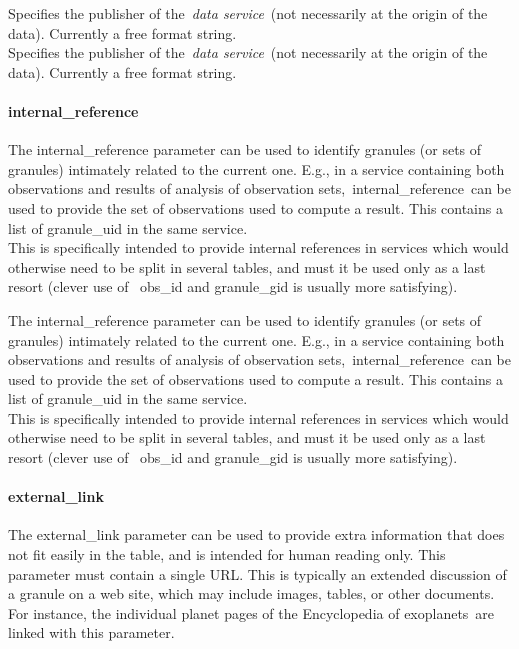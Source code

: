 \documentclass[11pt,a4paper]{ivoa}
\begin{document}
Specifies the publisher of the \emph{data service} (not necessarily at the origin of the data). Currently a free format string.\\

Specifies the publisher of the \emph{data service} (not necessarily at the origin of the data). Currently a free format string.\\

\paragraph{internal\_reference}

The internal\_reference parameter can be used to identify granules (or sets of granules) intimately related to the current one. E.g., in a service containing both observations and results of analysis of observation sets, internal\_reference can be used to provide the set of observations used to compute a result. This contains a list of granule\_uid in the same service.\\This is specifically intended to provide internal references in services which would otherwise need to be split in several tables, and must it be used only as a last resort (clever use of  obs\_id and granule\_gid is usually more satisfying). 

The internal\_reference parameter can be used to identify granules (or sets of granules) intimately related to the current one. E.g., in a service containing both observations and results of analysis of observation sets, internal\_reference can be used to provide the set of observations used to compute a result. This contains a list of granule\_uid in the same service.\\This is specifically intended to provide internal references in services which would otherwise need to be split in several tables, and must it be used only as a last resort (clever use of  obs\_id and granule\_gid is usually more satisfying). 

\paragraph{external\_link}

The external\_link parameter can be used to provide extra information that does not fit easily in the table, and is intended for human reading only. This parameter must contain a single URL. This is typically an extended discussion of a granule on a web site, which may include images, tables, or other documents. For instance, the individual planet pages of the Encyclopedia of exoplanets are linked with this parameter.\\
\end{document}
